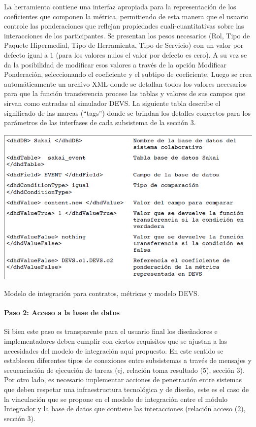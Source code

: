 La herramienta contiene una interfaz apropiada para la representación de los
coeficientes que componen la métrica, permitiendo de esta manera que el usuario
controle las ponderaciones que reflejan propiedades cuali-cuantitativas sobre
las interacciones de los participantes. Se presentan los pesos necesarios (Rol,
Tipo de Paquete Hipermedial, Tipo de Herramienta, Tipo de Servicio) con un valor
por defecto igual a 1 (para los valores nulos el valor por defecto es cero). A
su vez se da la posibilidad de modificar esos valores a través de la opción
Modificar Ponderación, seleccionando el coeficiente y el subtipo de coeficiente.
Luego se crea automáticamente un archivo XML donde se detallan todos los valores
necesarios para que la función transferencia procese las tablas y valores de sus
campos que sirvan como entradas al simulador DEVS. La siguiente tabla describe
el significado de las marcas (“tags”)  donde se brindan los detalles concretos
para los parámetros de las interfases de cada subsistema de la sección 3.


\begin{center}
 \includegraphics[width=5 in,totalheight=4 in] {Ch9/f13}
\end{center}
\caption{Modelo de integración para contratos, métricas y modelo DEVS.}



\paragraph{Paso 2: Acceso a la base de datos}


Si bien este paso es transparente para el usuario final los diseñadores e
implementadores deben cumplir con ciertos requisitos que se ajustan a las
necesidades del modelo de integración aquí propuesto. En este sentido se
establecen diferentes tipos de conexiones entre subsistemas a través de mensajes
y secuenciación  de ejecución de tareas (ej, relación toma resultado (5),
sección 3). Por otro lado, es necesario implementar acciones de penetración
entre sistemas que deben respetar una infraestructura tecnológica y de diseño,
este es el caso de la vinculación que se propone en el modelo de integración
entre el módulo Integrador y la base de datos que contiene las interacciones
(relación acceso (2), sección 3).


